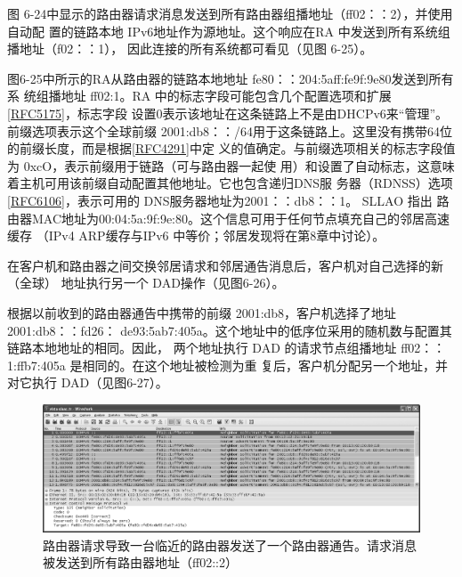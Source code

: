 图 6-24中显示的路由器请求消息发送到所有路由器组播地址（ff02：：2），并使用自动配
置的链路本地 IPv6地址作为源地址。这个响应在RA 中发送到所有系统组播地址（f02：：1），
因此连接的所有系统都可看见（见图 6-25）。

图6-25中所示的RA从路由器的链路本地地址 fe80：：204:5aff:fe9f:9e80发送到所有系
统组播地址 ff02:1。RA 中的标志字段可能包含几个配置选项和扩展\href{https://www.rfc-editor.org/rfc/rfc5175}{\href{https://www.rfc-editor.org/rfc/rfc5175}{[RFC5175]}}，标志字段
设置0表示该地址在这条链路上不是由DHCPv6来“管理”。前缀选项表示这个全球前缀
2001:db8：：/64用于这条链路上。这里没有携带64位的前缀长度，而是根据\href{https://www.rfc-editor.org/rfc/rfc4291}{\href{https://www.rfc-editor.org/rfc/rfc4291}{[RFC4291]}}中定
义的值确定。与前缀选项相关的标志字段值为 0xcO，表示前缀用于链路（可与路由器一起使
用）和设置了自动标志，这意味着主机可用该前缀自动配置其他地址。它也包含递归DNS服
务器（RDNSS）选项\href{https://www.rfc-editor.org/rfc/rfc6106}{\href{https://www.rfc-editor.org/rfc/rfc6106}{[RFC6106]}}，表示可用的 DNS服务器地址为2001：：db8：：1。 SLLAO 指出
路由器MAC地址为00:04:5a:9f:9e:80。这个信息可用于任何节点填充自己的邻居高速缓存
（IPv4 ARP缓存与IPv6 中等价；邻居发现将在第8章中讨论）。

在客户机和路由器之间交换邻居请求和邻居通告消息后，客户机对自己选择的新（全球）
地址执行另一个 DAD操作（见图6-26）。

根据以前收到的路由器通告中携带的前缀 2001:db8，客户机选择了地址 2001:db8：：fd26：
de93:5ab7:405a。这个地址中的低序位采用的随机数与配置其链路本地地址的相同。因此，
两个地址执行 DAD 的请求节点组播地址 ff02：：1:ffb7:405a 是相同的。在这个地址被检测为重
复后，客户机分配另一个地址，并对它执行 DAD（见图6-27）。

\begin{figure}[H]
    \centering
	\includegraphics[scale=0.5]{imgs/6/6-23.png}
	\caption{路由器请求导致一台临近的路由器发送了一个路由器通告。请求消息被发送到所有路由器地址（ff02::2）}
\end{figure}

